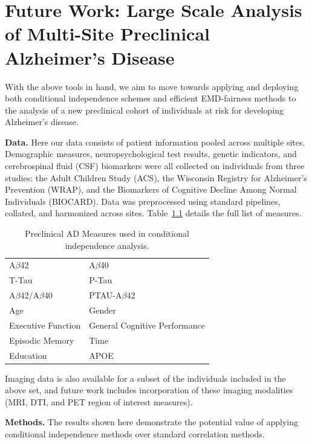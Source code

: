\chapter{Future Work: Large Scale Analysis of Multi-Site Preclinical Alzheimer's Disease} \label{chap:pac} 

With the above tools in hand, we aim to move towards applying and deploying both conditional independence schemes and efficient EMD-fairness methods to 
the analysis of a new preclinical cohort of individuals at risk for developing Alzheimer's disease.

\textbf{Data.} Here our data consists of patient information pooled across multiple sites. Demographic measures, neuropsychological test results, genetic indicators, and cerebrospinal fluid (CSF) biomarkers were all collected on individuals from three studies: the Adult Children Study (ACS), the Wisconsin Registry for Alzheimer's Prevention (WRAP), and the Biomarkers of Cognitive Decline Among Normal Individuals (BIOCARD). Data was preprocessed using standard pipelines, collated, and harmonized across sites. Table~\ref{tab:pacfeats} details the full list of measures.

\begin{table}
    \centering
    \begin{tabular}{l|l}
        \hline\hline
         A$\beta$42 & A$\beta$40 \\
         T-Tau & P-Tau \\
         A$\beta$42/A$\beta$40 & PTAU-A$\beta$42 \\
         Age & Gender \\
         Executive Function & General Cognitive Performance \\
         Episodic Memory & Time \\
         Education & APOE \\
         \hline\hline
    \end{tabular}
    \caption{Preclinical AD Measures used in conditional independence analysis.}
    \label{tab:pacfeats}
\end{table}

Imaging data is also available for a subset of the individuals included in the above set, and future work includes incorporation of these imaging modalities (MRI, DTI, and PET region of interest measures).

\textbf{Methods.} The results shown here demonstrate the potential value of applying conditional independence methods over standard correlation methods. 


